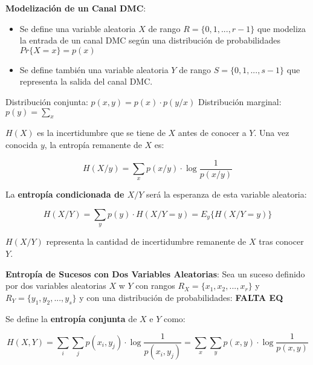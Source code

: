 \documentclass[10pt,landscape]{article}
\begin{document}
\begin{multicols}{3}
\textbf{Modelización de un Canal DMC}:

\begin{itemize}
	\item Se define una variable aleatoria $X$ de rango $R = \{0, 1, ..., r-1\}$ que modeliza la entrada de un canal DMC según una distribución de probabilidades $Pr\{X = x \} = p(x)$
	\item Se define también una variable aleatoria $Y$ de rango $S = \{ 0, 1, ..., s-1 \}$ que representa la salida del canal DMC.
\end{itemize}

Distribución conjunta: $p(x, y) = p(x) \cdot p(y/x)$
Distribución marginal: $p(y) = \sum_x$

\begin{center}
\end{center}

$H(X)$ es la incertidumbre que se tiene de $X$ antes de conocer a $Y$. Una vez conocida $y$, la entropía remanente de $X$ es:

\begin{equation*}
	H(X/y) = \sum_x p(x/y) \cdot \log \frac{1}{p(x/y)}
\end{equation*}

La \textbf{entropía condicionada de $X/Y$} será la esperanza de esta variable aleatoria:

\begin{equation*}
	H(X/Y) = \sum_y p(y) \cdot H(X/Y = y) = E_y \{ H(X/Y = y) \}
\end{equation*}

$H(X/Y)$ representa la cantidad de incertidumbre remanente de $X$ tras conocer $Y$.

\textbf{Entropía de Sucesos con Dos Variables Aleatorias}: Sea un suceso definido por dos variables aleatorias $X$ w $Y$ con rangos $R_X = \{x_1, x_2, ..., x_r \}$ y $R_Y = \{ y_1, y_2, ..., y_s \}$ y con una distribución de probabilidades: \textbf{FALTA EQ}

Se define la \textbf{entropía conjunta} de $X$ e $Y$ como:

\begin{equation*}
	H(X, Y) = \sum_i \sum_j p(x_i, y_j) \cdot \log \frac{1}{p(x_i, y_j)} = \sum_x \sum_y p(x, y) \cdot \log \frac{1}{p(x, y)}
\end{equation*}


\end{multicols}
\end{document}
